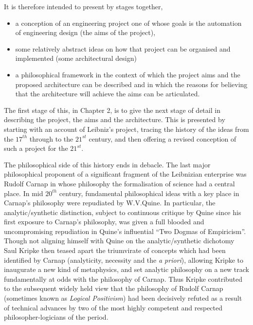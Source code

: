 It is therefore intended to present by stages together,
\begin{itemize}
\item a conception of an engineering project one of whose goals is the automation of engineering design (the aims of the project),
\item some relatively abstract ideas on how that project can be organised and implemented (some architectural design)
\item a philosophical framework in the context of which the project aims and the proposed architecture can be described and in which the reasons for believing that the architecture will achieve the aims can be articulated.
\end{itemize}

The first stage of this, in Chapter 2, is to give the next stage of detail in describing the project, the aims and the architecture. 
This is presented by starting with an account of Leibniz's project, tracing the history of the ideas from the $17^{th}$ through to the $21^{st}$ century, and then offering a revised conception of such a project for the $21^{st}$.

The philosophical side of this history ends in debacle.
The last major philosophical proponent of a significant fragment of the Leibnizian enterprise was Rudolf Carnap in whose philosophy the formalisation of science had a central place.
In mid $20^{th}$ century, fundamental philosophical ideas with a key place in Carnap's philosophy were repudiated by W.V.Quine.
In particular, the analytic/synthetic distinction, subject to continuous critique by Quine since his first exposure to Carnap's philosophy, was given a full blooded and uncompromising repudiation in Quine's influential ``Two Dogmas of Empiricism''.
Though not aligning himself with Quine on the analytic/synthetic dichotomy Saul Kripke then teased apart the triumvirate of concepts which had been identified by Carnap (analyticity, necessity and the \emph{a priori}), allowing Kripke to inaugurate a new kind of metaphysics, and set analytic philosophy on a new track fundamentally at odds with the philosophy of Carnap.
Thus Kripke contributed to the subsequent widely held view that the philosophy of Rudolf Carnap (sometimes known as \emph{Logical Positivism}) had been decisively refuted as a result of technical advances by two of the most highly competent and respected philosopher-logicians of the period.

